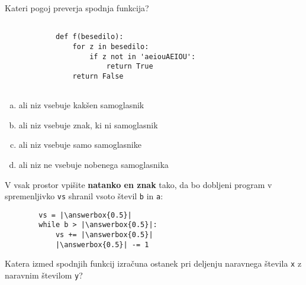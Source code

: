 \documentclass[arhiv, 10pt]{../izpit}
\newcommand{\inlinepy}[1]{\texttt{#1}}
\newcommand{\answerbox}[1]{\framebox{\vphantom{\large M}\hspace{#1cm}}}
\begin{document}
        \naloga*

        \begin{multicols}{2}
        \noindent
        Kateri pogoj preverja spodnja funkcija?
        \begin{verbatim}
        
            def f(besedilo):
                for z in besedilo:
                    if z not in 'aeiouAEIOU':
                        return True
                return False
            
        \end{verbatim}

        \begin{enumerate}[(a)]
\item ali niz vsebuje kakšen samoglasnik
\item ali niz vsebuje znak, ki ni samoglasnik
\item ali niz vsebuje samo samoglasnike
\item ali niz ne vsebuje nobenega samoglasnika
\end{enumerate}

        \end{multicols}
    
        \naloga*
        \begin{multicols}{2}
        \noindent
        V vsak prostor vpišite \textbf{natanko en znak} tako, da bo dobljeni program v spremenljivko \inlinepy{vs} shranil vsoto števil \inlinepy{b} in \inlinepy{a}:
        
        \columnbreak
        \begin{verbatim}
        vs = |\answerbox{0.5}|
        while b > |\answerbox{0.5}|:
            vs += |\answerbox{0.5}|
            |\answerbox{0.5}| -= 1
        \end{verbatim}
        \end{multicols}
    
        \clearpage
        \naloga
        
        Katera izmed spodnjih funkcij izračuna ostanek pri deljenju naravnega števila \inlinepy{x} z naravnim številom \inlinepy{y}?
    
\end{document}
